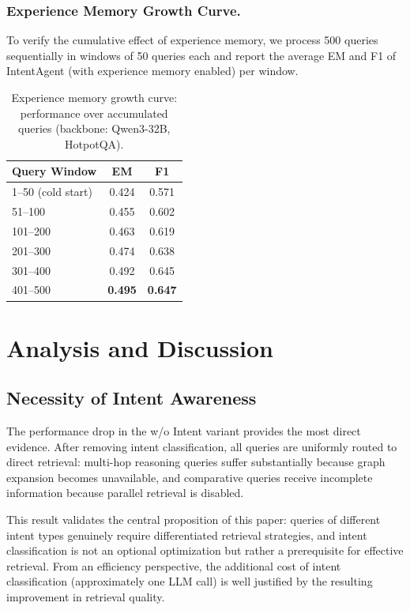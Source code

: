 \documentclass[runningheads]{llncs}
\begin{document}
\subsubsection{Experience Memory Growth Curve.}

To verify the cumulative effect of experience memory, we process 500 queries sequentially in windows of 50 queries each and report the average EM and F1 of IntentAgent (with experience memory enabled) per window.

\begin{table}[htbp]
\centering
\caption{Experience memory growth curve: performance over accumulated queries (backbone: Qwen3-32B, HotpotQA).}
\label{tab:memory_growth}
\begin{tabular}{l|cc}
\toprule
\textbf{Query Window} & \textbf{EM} & \textbf{F1} \\
\midrule
1--50 (cold start) & 0.424 & 0.571 \\
51--100 & 0.455 & 0.602 \\
101--200 & 0.463 & 0.619 \\
201--300 & 0.474 & 0.638 \\
301--400 & 0.492 & 0.645 \\
401--500 & \textbf{0.495} & \textbf{0.647} \\
\bottomrule
\end{tabular}
\end{table}


\section{Analysis and Discussion}

\subsection{Necessity of Intent Awareness}

The performance drop in the w/o Intent variant provides the most direct evidence. After removing intent classification, all queries are uniformly routed to direct retrieval: multi-hop reasoning queries suffer substantially because graph expansion becomes unavailable, and comparative queries receive incomplete information because parallel retrieval is disabled.

This result validates the central proposition of this paper: queries of different intent types genuinely require differentiated retrieval strategies, and intent classification is not an optional optimization but rather a prerequisite for effective retrieval. From an efficiency perspective, the additional cost of intent classification (approximately one LLM call) is well justified by the resulting improvement in retrieval quality.
\end{document}
